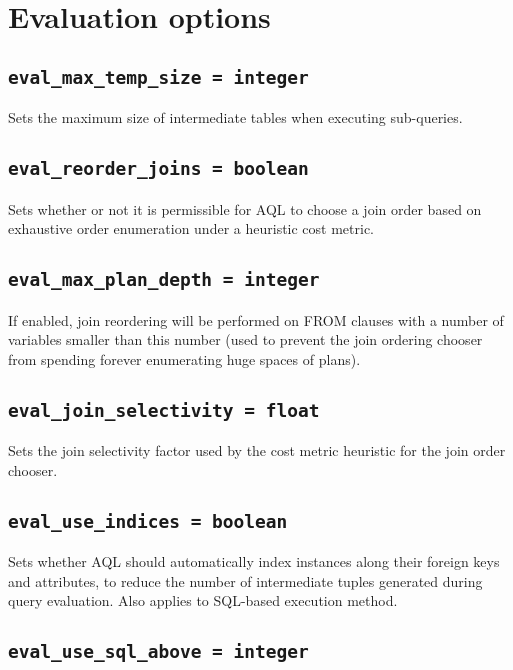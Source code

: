 \documentclass[10pt]{book}
\begin{document}
\section{Evaluation options}

\subsection{{\tt eval\_max\_temp\_size = integer}}

Sets the maximum size of intermediate tables when executing sub-queries.

\subsection{{\tt eval\_reorder\_joins = boolean}}

Sets whether or not it is permissible for AQL to choose a join order based on exhaustive order enumeration under a heuristic cost metric.

\subsection{{\tt eval\_max\_plan\_depth = integer}}

If enabled, join reordering will be performed on FROM clauses with a number of variables smaller than this number (used to prevent the join ordering chooser from spending forever enumerating huge spaces of plans).

\subsection{{\tt eval\_join\_selectivity = float}}

Sets the join selectivity factor used by the cost metric heuristic for the join order chooser.

\subsection{{\tt eval\_use\_indices = boolean}}
			
Sets whether AQL should automatically index instances along their foreign keys and attributes, to reduce the number of intermediate tuples generated during query evaluation.
Also applies to SQL-based execution method.

\subsection{{\tt eval\_use\_sql\_above = integer}}
\end{document}
